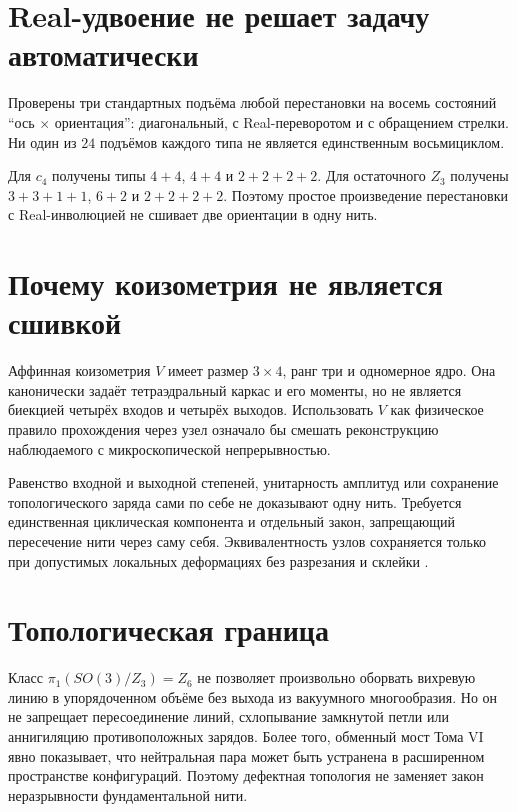 \section{Real-удвоение не решает задачу автоматически}

Проверены три стандартных подъёма любой перестановки на восемь состояний
``ось $\times$ ориентация'': диагональный, с Real-переворотом и с
обращением стрелки. Ни один из $24$ подъёмов каждого типа не является
единственным восьмициклом.

Для $c_4$ получены типы $4+4$, $4+4$ и $2+2+2+2$. Для остаточного $Z_3$
получены $3+3+1+1$, $6+2$ и $2+2+2+2$. Поэтому простое произведение
перестановки с Real-инволюцией не сшивает две ориентации в одну нить.

\section{Почему коизометрия не является сшивкой}

Аффинная коизометрия $V$ имеет размер $3\times4$, ранг три и одномерное
ядро. Она канонически задаёт тетраэдральный каркас и его моменты, но не
является биекцией четырёх входов и четырёх выходов. Использовать $V$ как
физическое правило прохождения через узел означало бы смешать
реконструкцию наблюдаемого с микроскопической непрерывностью.

\begin{nogocriterion}
Равенство входной и выходной степеней, унитарность амплитуд или сохранение
топологического заряда сами по себе не доказывают одну нить. Требуется
единственная циклическая компонента и отдельный закон, запрещающий
пересечение нити через саму себя. Эквивалентность узлов сохраняется только
при допустимых локальных деформациях без разрезания и склейки
\cite{single-thread-reidemeister1927}.
\end{nogocriterion}

\section{Топологическая граница}

Класс $\pi_1(SO(3)/Z_3)=Z_6$ не позволяет произвольно оборвать вихревую
линию в упорядоченном объёме без выхода из вакуумного многообразия. Но он
не запрещает пересоединение линий, схлопывание замкнутой петли или
аннигиляцию противоположных зарядов. Более того, обменный мост Тома VI
явно показывает, что нейтральная пара может быть устранена в расширенном
пространстве конфигураций. Поэтому дефектная топология не заменяет закон
неразрывности фундаментальной нити.

